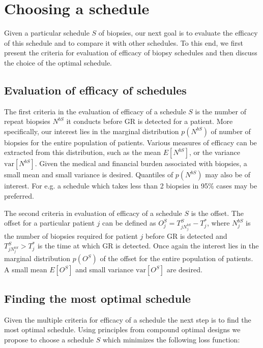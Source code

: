 
\section{Choosing a schedule}
\label{sec : choosing_schedule}
Given a particular schedule $S$ of biopsies, our next goal is to evaluate the efficacy of this schedule and to compare it with other schedules. To this end, we first present the criteria for evaluation of efficacy of biopsy schedules and then discuss the choice of the optimal schedule.

\subsection{Evaluation of efficacy of schedules}
The first criteria in the evaluation of efficacy of a schedule $S$ is the number of repeat biopsies $N^{bS}$ it conducts before GR is detected for a patient. More specifically, our interest lies in the marginal distribution $p(N^{bS})$ of number of biopsies for the entire population of patients. Various measures of efficacy can be extracted from this distribution, such as the mean $E[N^{bS}]$, or the variance $\mbox{var}[N^{bS}]$. Given the medical and financial burden associated with biopsies, a small mean and small variance is desired. Quantiles of $p(N^{bS})$ may also be of interest. For e.g. a schedule which takes less than 2 biopsies in 95\% cases may be preferred.

The second criteria in evaluation of efficacy of a schedule $S$ is the offset. The offset for a particular patient $j$ can be defined as $O^S_j = T^S_{j{N^{bS}_j}} - T^*_j$, where $N^{bS}_j$ is the number of biopsies required for patient $j$ before GR is detected and $T^S_{j{N^{bS}_j}} > T^*_j$ is the time at which GR is detected. Once again the interest lies in the marginal distribution $p(O^S)$ of the offset for the entire population of patients. A small mean $E[O^S]$ and small variance $\mbox{var}[O^S]$ are desired.

\subsection{Finding the most optimal schedule}
Given the multiple criteria for efficacy of a schedule the next step is to find the most optimal schedule. Using principles from compound optimal designs \citep{lauter1976optimal} we propose to choose a schedule $S$ which minimizes the following loss function:

